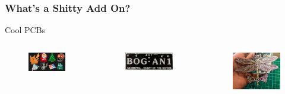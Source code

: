 \documentclass[t]{beamer}
\begin{document}

\begin{frame}
\frametitle{What's a Shitty Add On?}
Cool PCBs 
\begin{columns}[c]
	\begin{figure}
		\includegraphics[width=1\linewidth]{shittyadd-ons.png}
	\end{figure}

	\begin{figure}
		\includegraphics[width=1\linewidth]{bogan.jpg}
	\end{figure}
	
	\begin{figure}
		\includegraphics[width=1\linewidth]{hackerchix.jpg}
	\end{figure}
	

\end{columns}
\end{frame}
\end{document}
